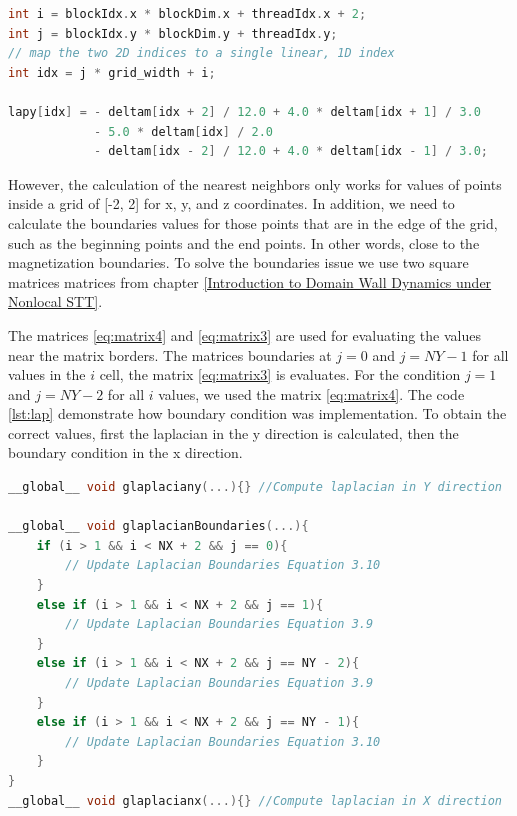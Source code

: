 \begin{lstlisting}[language=C++, label={lst:lpay}, caption={Laplacian X using global memory}]
int i = blockIdx.x * blockDim.x + threadIdx.x + 2;
int j = blockIdx.y * blockDim.y + threadIdx.y;
// map the two 2D indices to a single linear, 1D index
int idx = j * grid_width + i;

lapy[idx] = - deltam[idx + 2] / 12.0 + 4.0 * deltam[idx + 1] / 3.0
			- 5.0 * deltam[idx] / 2.0
			- deltam[idx - 2] / 12.0 + 4.0 * deltam[idx - 1] / 3.0;	
\end{lstlisting}


However, the calculation of the nearest neighbors only works for values of points inside a grid of [-2, 2] for x, y, and z coordinates. In addition, we need to calculate the boundaries values for those points that are in the edge of the grid, such as the beginning points and the end points. In other words, close to the magnetization boundaries. To solve the boundaries issue we use two square matrices matrices from chapter \ref{Introduction to Domain Wall Dynamics under Nonlocal STT}.

 The matrices \ref{eq:matrix4} and \ref{eq:matrix3} are used for evaluating the values near the matrix borders. The matrices boundaries at $j = 0$ and $j = NY - 1$ for all values in the $i$ cell, the matrix \ref{eq:matrix3} is evaluates. For the condition $j = 1$ and $j = NY - 2$ for all $i$ values, we used the matrix \ref{eq:matrix4}. The code \ref{lst:lap} demonstrate how boundary condition was implementation. To obtain the correct values, first the laplacian in the y direction is calculated, then the boundary condition in the x direction. 

\begin{lstlisting}[language=C++, label={lst:lap}, caption={Evaluation of Laplacian X, Y with boundary condition}]
__global__ void glaplaciany(...){} //Compute laplacian in Y direction

__global__ void glaplacianBoundaries(...){
    if (i > 1 && i < NX + 2 && j == 0){
     	// Update Laplacian Boundaries Equation 3.10
    }
    else if (i > 1 && i < NX + 2 && j == 1){
  		// Update Laplacian Boundaries Equation 3.9
    }
    else if (i > 1 && i < NX + 2 && j == NY - 2){
        // Update Laplacian Boundaries Equation 3.9
    }
    else if (i > 1 && i < NX + 2 && j == NY - 1){
        // Update Laplacian Boundaries Equation 3.10
    }
}
__global__ void glaplacianx(...){} //Compute laplacian in X direction
\end{lstlisting}

